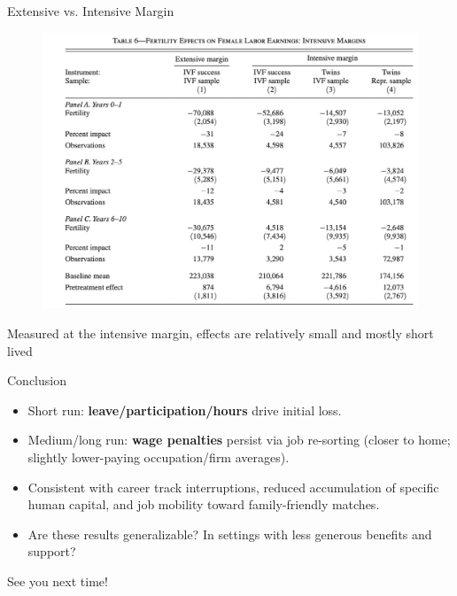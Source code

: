 \documentclass[11pt,notes=hide,aspectratio=169,mathserif]{beamer}
\begin{document}
\begin{frame}{Extensive vs. Intensive Margin}
  \begin{figure}
    \centering
    \includegraphics[width=0.6\linewidth]{inputs/ivf12.png}
    \end{figure}
    Measured at the intensive margin, effects are relatively small and mostly short lived
  \end{frame}

\begin{frame}{Conclusion}
\small
\begin{itemize}
  \item Short run: \textbf{leave/participation/hours} drive initial loss.
  \item Medium/long run: \textbf{wage penalties} persist via job re-sorting (closer to home; slightly lower-paying occupation/firm averages).
  \item Consistent with career track interruptions, reduced accumulation of specific human capital, and job mobility toward family-friendly matches.
  \item Are these results generalizable? In settings with less generous benefits and support? 
\end{itemize}
\end{frame}


\begin{frame}
\begin{center}{\LARGE See you next time!}\end{center}
\end{frame}
\end{document}
